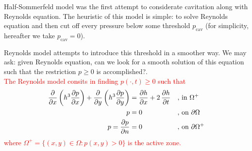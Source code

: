 Half-Sommerfeld model was the first attempt to considerate cavitation along with Reynolds equation. The heuristic of this model is simple: to solve Reynolds equation and then cut off every pressure below some threshold $p_\text{cav}$ (for simplicity, hereafter we take $p_\text{cav}=0$).

Reynolds model attempts to introduce this threshold in a smoother way. We may ask: given Reynolds equation, can we look for a smooth solution of this equation such that the restriction $p\geq 0$ is accomplished?.\\
\textcolor{red}{
The Reynolds model consits in finding $p(\cdot,t) \geq 0$ such that
\begin{align}
\frac{\partial}{\partial x}\left({h^3}\frac{\partial p}{\partial x}\right)+\frac{\partial}{\partial y}\left({h^3}\frac{\partial p}{\partial y}\right)&=\frac{\partial h}{\partial x}+2\,\parder{h}{t}&,&\text{ in }\Omega^+\label{eq:reynolds_math2}\\
p&=0&,&\text{ on }\partial \Omega\label{eq:reynolds_math_bound2}\\
p=\dfrac{\partial p}{\partial n}&=0&,&\text{ on }\partial \Omega^+\label{eq:reynolds_math_bound3}
\end{align}
where $\Omega^+=\{(x,y) \in \Omega:p(x,y) > 0\}$ is the active zone.
}

